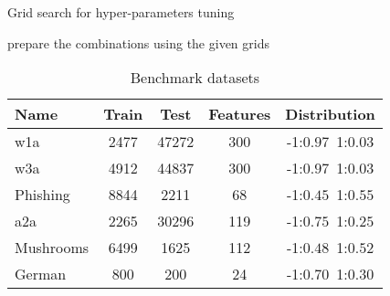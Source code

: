 
\begin{algorithm}
\caption{Grid search for hyper-parameters tuning}\label{alg:grid-search}
prepare the combinations using the given grids\;
\end{algorithm}

\begin{table}
\centering
\caption{Benchmark datasets}
\label{tab:datasets}
\begin{tabular}{lSSSc}
\toprule
Name & {Train} & {Test} & {Features} & {Distribution} \\
\midrule
w1a & 2477 & 47272 & 300 & -1:$0.97$\,\,\,1:$0.03$ \\
w3a & 4912 & 44837 & 300 & -1:$0.97$\,\,\,1:$0.03$ \\
Phishing & 8844 & 2211 & 68 & -1:$0.45$\,\,\,1:$0.55$ \\
a2a & 2265 & 30296 & 119 & -1:$0.75$\,\,\,1:$0.25$ \\
Mushrooms & 6499 & 1625 & 112 & -1:$0.48$\,\,\,1:$0.52$ \\
German & 800 & 200 & 24 & -1:$0.70$\,\,\,1:$0.30$ \\
\bottomrule
\end{tabular}
\end{table}

\cleardoublepage

